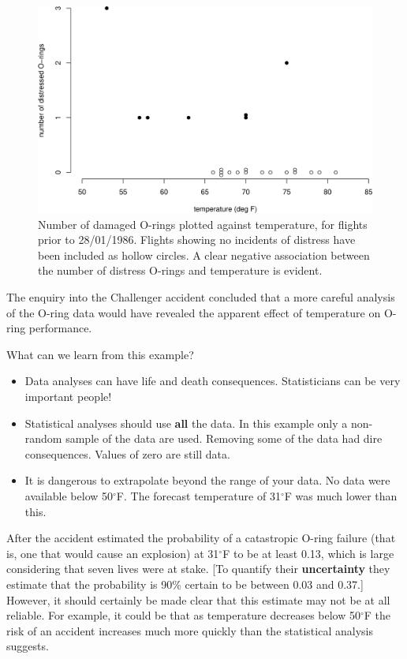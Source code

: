 \documentclass[
  british,
]{book}
\providecommand{\tightlist}{%
  \setlength{\itemsep}{0pt}\setlength{\parskip}{0pt}}
\begin{document}
\begin{figure}

{\centering \includegraphics[width=0.8\linewidth]{images/shuttle2} 

}

\caption{Number of damaged O-rings plotted against temperature, for flights prior to 28/01/1986. Flights showing no incidents of distress have been included as hollow circles.  A clear negative association between the number of distress O-rings and temperature is evident.}\label{fig:shuttle2}
\end{figure}

The enquiry into the Challenger accident concluded that a more careful analysis of the O-ring data would have revealed the apparent effect of temperature on O-ring performance.

What can we learn from this example?

\begin{itemize}
\tightlist
\item
  Data analyses can have life and death consequences. Statisticians can be very important people!\\
\item
  Statistical analyses should use \textbf{all} the data. In this example only a non-random sample of the data are used. Removing some of the data had dire consequences. Values of zero are still data.
\item
  It is dangerous to extrapolate beyond the range of your data. No data were available below 50\(^\circ\)F. The forecast temperature of 31\(^\circ\)F was much lower than this.
\end{itemize}

After the accident \citet{shuttle} estimated the probability of a catastropic O-ring failure (that is, one that would cause an explosion) at 31\(^\circ\)F to be at least 0.13, which is large considering that seven lives were at stake. {[}To quantify their \textbf{uncertainty} they estimate that the probability is 90\% certain to be between 0.03 and 0.37.{]} However, it should certainly be made clear that this estimate may not be at all reliable. For example, it could be that as temperature decreases below 50\(^\circ\)F the risk of an accident increases much more quickly than the statistical analysis suggests.
\end{document}
